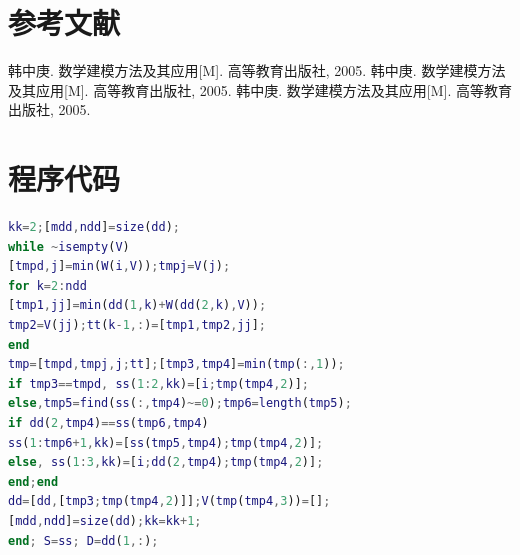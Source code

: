 \documentclass[bwprint]{gmcmthesis}
\numberwithin{figure}{section}
\begin{document}
%

\section{参考文献}
\begin{thebibliography}{1.2}%
\setlength{\itemsep}{-2mm}
 韩中庚. 数学建模方法及其应用[M]. 高等教育出版社, 2005.
 韩中庚. 数学建模方法及其应用[M]. 高等教育出版社, 2005.
 韩中庚. 数学建模方法及其应用[M]. 高等教育出版社, 2005.
\end{thebibliography}

\newpage
\appendix
\section{程序代码}
\begin{lstlisting}[language=Matlab] 
kk=2;[mdd,ndd]=size(dd);
while ~isempty(V)
[tmpd,j]=min(W(i,V));tmpj=V(j);
for k=2:ndd
[tmp1,jj]=min(dd(1,k)+W(dd(2,k),V));
tmp2=V(jj);tt(k-1,:)=[tmp1,tmp2,jj];
end
tmp=[tmpd,tmpj,j;tt];[tmp3,tmp4]=min(tmp(:,1));
if tmp3==tmpd, ss(1:2,kk)=[i;tmp(tmp4,2)];
else,tmp5=find(ss(:,tmp4)~=0);tmp6=length(tmp5);
if dd(2,tmp4)==ss(tmp6,tmp4)
ss(1:tmp6+1,kk)=[ss(tmp5,tmp4);tmp(tmp4,2)];
else, ss(1:3,kk)=[i;dd(2,tmp4);tmp(tmp4,2)];
end;end
dd=[dd,[tmp3;tmp(tmp4,2)]];V(tmp(tmp4,3))=[];
[mdd,ndd]=size(dd);kk=kk+1;
end; S=ss; D=dd(1,:);
 \end{lstlisting}
\end{document}
